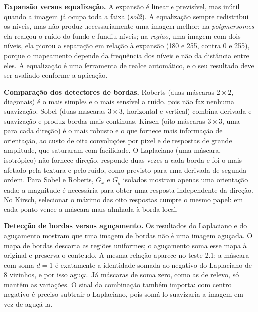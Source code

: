 \documentclass[11pt,a4paper]{article}
\begin{document}
\textbf{Expansão versus equalização.} A expansão é linear e previsível, mas inútil quando a
imagem já ocupa toda a faixa (\textit{sol2}). A equalização sempre redistribui os níveis, mas
não produz necessariamente uma imagem melhor: na \textit{polymersomes} ela realçou o ruído do
fundo e fundiu níveis; na \textit{regiao}, uma imagem com dois níveis, ela piorou a separação
em relação à expansão (180 e 255, contra 0 e 255), porque o mapeamento depende da frequência
dos níveis e não da distância entre eles. A equalização é uma ferramenta de realce automático,
e o seu resultado deve ser avaliado conforme a aplicação.

\textbf{Comparação dos detectores de bordas.} Roberts (duas máscaras $2 \times 2$, diagonais) é
o mais simples e o mais sensível a ruído, pois não faz nenhuma suavização. Sobel (duas máscaras
$3 \times 3$, horizontal e vertical) combina derivada e suavização e produz bordas mais
contínuas. Kirsch (oito máscaras $3 \times 3$, uma para cada direção) é o mais robusto e o que
fornece mais informação de orientação, ao custo de oito convoluções por pixel e de respostas de
grande amplitude, que saturaram com facilidade. O Laplaciano (uma máscara, isotrópico) não
fornece direção, responde duas vezes a cada borda e foi o mais afetado pela textura e pelo
ruído, como previsto para uma derivada de segunda ordem. Para Sobel e Roberts, $G_x$ e $G_y$
isolados mostram apenas uma orientação cada; a magnitude é necessária para obter uma resposta
independente da direção. No Kirsch, selecionar o máximo das oito respostas cumpre o mesmo
papel: em cada ponto vence a máscara mais alinhada à borda local.

\textbf{Detecção de bordas versus aguçamento.} Os resultados do Laplaciano e do aguçamento
mostram que uma imagem de bordas não é uma imagem aguçada. O mapa de bordas descarta as regiões
uniformes; o aguçamento soma esse mapa à original e preserva o conteúdo. A mesma relação aparece
no teste 2.1: a máscara com soma $d = 1$ é exatamente a identidade somada ao negativo do
Laplaciano de 8 vizinhos, e por isso aguça. Já máscaras de soma zero, como as de relevo, só
mantêm as variações. O sinal da combinação também importa: com centro negativo é preciso
subtrair o Laplaciano, pois somá-lo suavizaria a imagem em vez de aguçá-la.
\end{document}
